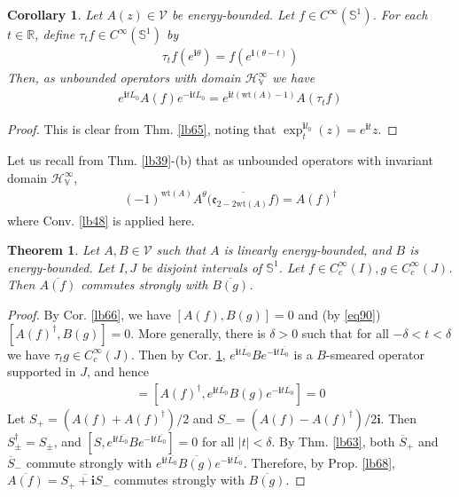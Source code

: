\documentclass[12pt,b5paper,notitlepage]{article}
\theoremstyle{definition}
\theoremstyle{plain}
\newtheorem{thm}[df]{Theorem}
\newtheorem{co}[df]{Corollary}
\newcommand{\mc}{\mathcal}
\newcommand{\ovl}{\overline}
\newcommand{\im}{\mathbf{i}}
\newcommand{\Rbb}{\mathbb R}
\newcommand{\wt}{\mathrm{wt}}
\newcommand{\Sbb}{{\mathbb S}}
\newcommand{\HV}{\mathcal H_{\mathbb V}}
\newcommand{\ek}{\mathfrak{e}}
\numberwithin{equation}{section}
\begin{document}
\begin{co}\label{lb67}
Let $A(z)\in\mc V$ be energy-bounded. Let $f\in C^\infty(\Sbb^1)$. For each $t\in\Rbb$, define $\tau_tf\in C^\infty(\Sbb^1)$ by
\begin{align*}
\tau_tf(e^{\im\theta})=f(e^{\im(\theta-t)})
\end{align*}
Then, as unbounded operators with domain $\HV^\infty$ we have
\begin{align}
e^{\im t\ovl{L_0}}A(f)e^{-\im t\ovl{L_0}}=e^{\im t(\wt(A)-1)}A(\tau_tf)
\end{align}
\end{co}

\begin{proof}
This is clear from Thm. \ref{lb65}, noting that $\exp^{\im l_0}_t(z)=e^{\im t}z$.
\end{proof}


Let us recall from Thm. \ref{lb39}-(b) that as unbounded operators with invariant domain $\HV^\infty$, 
\begin{align}\label{eq90}
(-1)^{\wt(A)}A^\theta\big(\ovl{\ek_{2-2\wt(A)}f}\big)=A(f)^\dagger
\end{align}
where Conv. \ref{lb48} is applied here.

\begin{thm}\label{lb108}
Let $A,B\in\mc V$ such that $A$ is linearly energy-bounded, and $B$ is energy-bounded. Let $I,J$ be disjoint intervals of $\Sbb^1$. Let $f\in C_c^\infty(I),g\in C_c^\infty(J)$. Then $\ovl{A(f)}$ commutes strongly with $\ovl{B(g)}$. 
\end{thm}


\begin{proof}
By Cor. \ref{lb66}, we have $[A(f),B(g)]=0$ and (by \eqref{eq90}) $[A(f)^\dagger,B(g)]=0$. More generally, there is $\delta>0$ such that for all $-\delta<t<\delta$ we have $\tau_tg\in C_c^\infty(J)$. Then by Cor. \ref{lb67}, $e^{\im t\ovl{L_0}}Be^{-\im t\ovl{L_0}}$ is a $B$-smeared operator supported in $J$, and hence
\begin{align*}
[A(f),e^{\im t\ovl{L_0}}B(g)e^{-\im t\ovl{L_0}}]=[A(f)^\dagger,e^{\im t\ovl{L_0}}B(g)e^{-\im t\ovl{L_0}}]=0
\end{align*} 
Let $S_+=(A(f)+A(f)^\dagger)/2$ and $S_-=(A(f)-A(f)^\dagger)/2\im$. Then $S_\pm^\dagger=S_\pm$, and $[S,e^{\im t\ovl{L_0}}Be^{-\im t\ovl{L_0}}]=0$ for all $|t|<\delta$. By Thm. \ref{lb63}, both $\ovl S_+$ and $\ovl S_-$ commute strongly with $e^{\im t\ovl{L_0}}\ovl{B(g)}e^{-\im t\ovl{L_0}}$. Therefore, by Prop. \ref{lb68}, $\ovl{A(f)}=\ovl{S_++\im S_-}$ commutes strongly with $\ovl{B(g)}$.
\end{proof}
\end{document}
